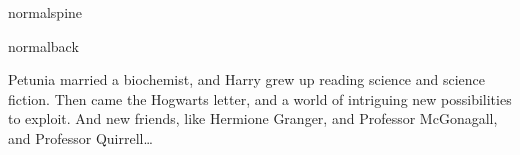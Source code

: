 \documentclass[12pt,coverwidth=\the\hpcoverwidth,coverheight=\the\hpcoverheight,spinewidth=\the\hpspinewidth,marklength=0mm,bleedwidth=5mm,flapwidth=0mm]{bookcover}
\begin{document}
\begin{bookcover}

\begin{bookcoverelement}{normal}{spine}
\centering
\color{white}\scshape
\vspace{0.5cm}\huge \volumenumber\\[2ex]\Large
\vfill
{}
\vfill
\end{bookcoverelement}

\begin{bookcoverelement}{normal}{back}
  \centering
  \vspace{20mm}
  \parbox{110mm}{\color{white}\Large\raggedright
Petunia married a biochemist, and Harry grew up reading science and science fiction. Then came the Hogwarts letter, and a world of intriguing new possibilities to exploit. And new friends, like Hermione Granger, and Professor McGonagall, and Professor Quirrell…
}
\end{bookcoverelement}

\end{bookcover}
\end{document}
